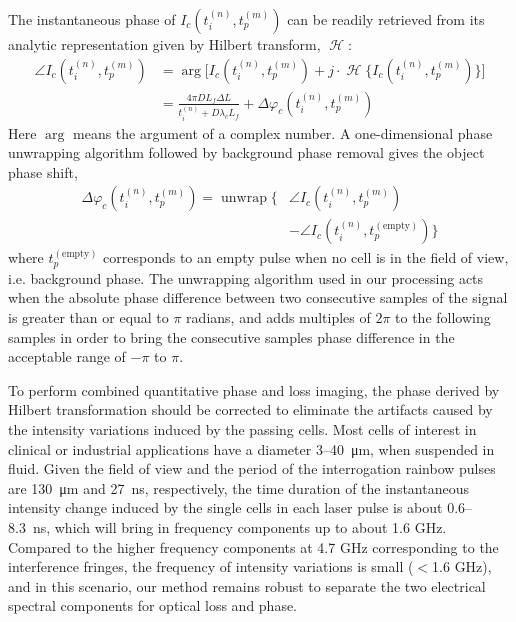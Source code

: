 \documentclass[aps,pra,reprint,longbibliography,superscriptaddress]{revtex4-1}
\DeclareMathOperator{\hilbert}{\mathcal{H}} %
\DeclareMathOperator{\unwrap}{unwrap} %
\begin{document}
The instantaneous phase of $I_c(t_i^{(n)}, t_p^{(m)})$ can be readily retrieved from its analytic representation given by Hilbert transform, $\hilbert$:
\begin{equation} \label{eqn:angle}
\begin{split}
\angle I_c(t_i^{(n)}, t_p^{(m)}) &= \arg\Big[I_c(t_i^{(n)}, t_p^{(m)}) + j \cdot \hilbert \lbrace I_c(t_i^{(n)}, t_p^{(m)}) \rbrace\Big] \\
&=  \frac{4\pi D L_f\Delta L}{t_i^{(n)} + D\lambda_c L_f} + \Delta \varphi_c(t_i^{(n)}, t_p^{(m)})
\end{split}
\end{equation}
Here $\arg$ means the argument of a complex number. A one-dimensional phase unwrapping algorithm followed by background phase removal gives the object phase shift, 
\begin{equation}
\begin{split}
\Delta\varphi_c(t_i^{(n)}, t_p^{(m)}) = \unwrap \lbrace &\angle I_c(t_i^{(n)}, t_p^{(m)}) \\
&- \angle I_c(t_i^{(n)}, t_p^{(\text{empty})}) \rbrace
\end{split}
\end{equation}
where $t_p^{(\text{empty})}$ corresponds to an empty pulse when no cell is in the field of view, i.e. background phase. The unwrapping algorithm used in our processing acts when the absolute phase difference between two consecutive samples of the signal is greater than or equal to $\pi$ radians, and adds multiples of $2\pi$ to the following samples in order to bring the consecutive samples phase difference in the acceptable range of $-\pi$ to $\pi$. 

To perform combined quantitative phase and loss imaging, the phase derived by Hilbert transformation should be corrected to eliminate the artifacts caused by the intensity variations induced by the passing cells. Most cells of interest in clinical or industrial applications have a diameter 3--\SI{40}{\micro\meter}, when suspended in fluid. Given the field of view and the period of the interrogation rainbow pulses are \SI{130}{\micro\meter} and \SI{27}{\nano\second}, respectively, the time duration of the instantaneous intensity change induced by the single cells in each laser pulse is about 0.6--\SI{8.3}{\nano\second}, which will bring in frequency components up to about 1.6 GHz. Compared to the higher frequency components at 4.7 GHz corresponding to the interference fringes, the frequency of intensity variations is small ($<$1.6 GHz), and in this scenario, our method remains robust to separate the two electrical spectral components for optical loss and phase.
\end{document}
